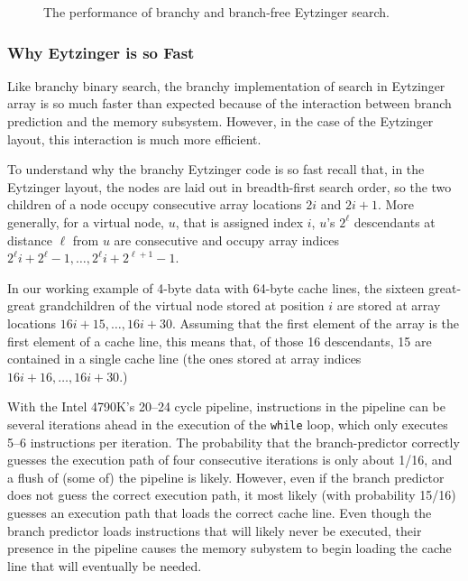 \documentclass{patmorin}
\begin{document}
\begin{figure}
   \caption{The performance of branchy and branch-free Eytzinger search.}
\end{figure}

\subsubsection{Why Eytzinger is so Fast}

Like branchy binary search, the branchy implementation of search in
Eytzinger array is so much faster than expected because of the interaction
between branch prediction and the memory subsystem.  However, in the
case of the Eytzinger layout, this interaction is much more efficient.

To understand why the branchy Eytzinger code is so fast recall that,
in the Eytzinger layout, the nodes are laid out in breadth-first
search order,  so the two children of a node occupy consecutive array
locations $2i$ and $2i+1$. More generally, for a virtual node, $u$,
that is assigned index $i$, $u$'s $2^\ell$ descendants at distance
$\ell$ from $u$ are consecutive and occupy array indices $2^\ell i +
2^{\ell}-1,\ldots,2^{\ell} i + 2^{\ell+1}-1$.

In our working example of 4-byte data with 64-byte cache lines, the
sixteen great-great grandchildren of the virtual node stored at position
$i$ are stored at array locations $16i+15,\ldots,16i+30$.  Assuming that
the first element of the array is the first element of a cache line,
this means that, of those 16 descendants, 15 are contained in a single
cache line (the ones stored at array indices $16i+16,\ldots,16i+30$.)

With the Intel 4790K's 20--24 cycle pipeline, instructions in
the pipeline can be several iterations ahead in the execution of the
\texttt{while} loop, which only executes 5--6 instructions per
iteration.  The probability that the branch-predictor correctly guesses
the execution path of four consecutive iterations is only about 1/16,
and a flush of (some of) the pipeline is likely.  However, even if the
branch predictor does not guess the correct execution path, it most likely
(with probability 15/16) guesses an execution path that loads the correct
cache line.  Even though the branch predictor loads instructions that will
likely never be executed, their presence in the pipeline causes the memory
subystem to begin loading the cache line that will eventually be needed.
\end{document}
